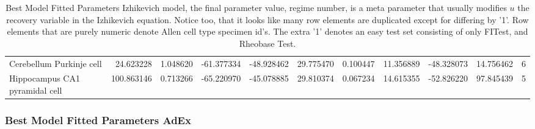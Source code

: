 \begin{table}
{\begin{tabular}{lrrrrrrrrrr}
Cerebellum Purkinje cell           &   24.623228 &  1.048620 & -61.377334 & -48.928462 &  29.775470 &  0.100447 &  11.356889 & -48.328073 &   14.756462 &         6 \\
Hippocampus CA1 pyramidal cell     &  100.863146 &  0.713266 & -65.220970 & -45.078885 &  29.810374 &  0.067234 &  14.615355 & -52.826220 &   97.845439 &         5 \\
\bottomrule
\end{tabular}}
\caption[Best Model Fitted Parameters Izhikevich model]{Best Model Fitted Parameters Izhikevich model, the final parameter value, regime number, is a meta parameter that usually modifies $u$ the recovery variable in the Izhikevich equation. Notice too, that it looks like many row elements are duplicated except for differing by '1'. Row elements that are purely numeric denote Allen cell type specimen id's. The extra '1' denotes an easy test set consisting of only FITest, and Rheobase Test.}
\end{table}
\clearpage
\subsubsection{Best Model Fitted Parameters AdEx}

